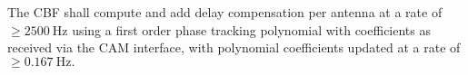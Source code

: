 The CBF shall compute and add delay compensation per antenna at a rate of $\ge
\SI{2500}{\hertz}$ using a first order phase tracking polynomial with
coefficients as received via the CAM interface, with polynomial coefficients
updated at a rate of $\ge \SI{0.167}{\hertz}.$
